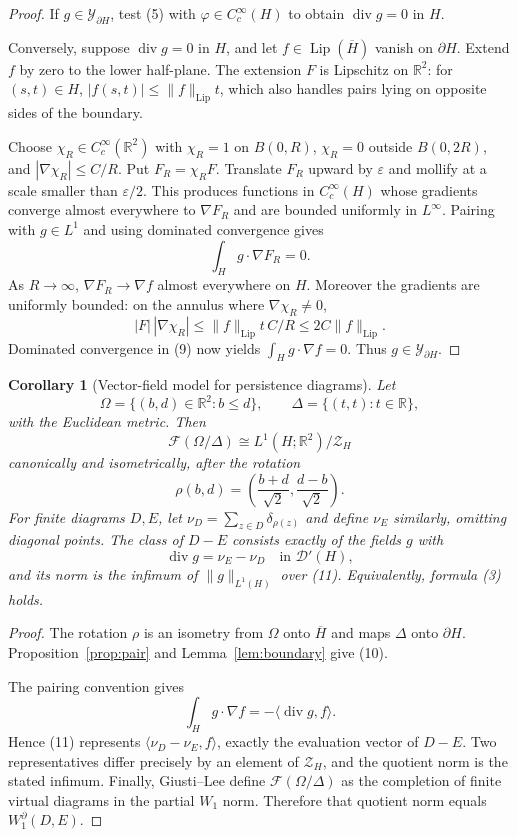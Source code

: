 \documentclass[11pt]{article}
\newtheorem{corollary}[theorem]{Corollary}
\newcommand{\F}{\mathcal F}
\newcommand{\Lip}{\operatorname{Lip}}
\newcommand{\R}{\mathbb R}
\newcommand{\D}{\mathcal D}
\newcommand{\diver}{\operatorname{div}}
\begin{document}
\begin{proof}
If $g\in\mathcal Y_{\partial H}$, test (5) with
$\varphi\in C_c^\infty(H)$ to obtain $\diver g=0$ in $H$.

Conversely, suppose $\diver g=0$ in $H$, and let
$f\in\Lip(\overline H)$ vanish on $\partial H$.  Extend $f$ by zero to the
lower half-plane.  The extension $F$ is Lipschitz on $\R^2$: for
$(s,t)\in H$, $|f(s,t)|\le \|f\|_{\Lip}t$, which also handles pairs lying on
opposite sides of the boundary.

Choose $\chi_R\in C_c^\infty(\R^2)$ with $\chi_R=1$ on $B(0,R)$,
$\chi_R=0$ outside $B(0,2R)$, and $|\nabla\chi_R|\le C/R$.  Put
$F_R=\chi_RF$.  Translate $F_R$ upward by $\varepsilon$ and mollify at a
scale smaller than $\varepsilon/2$.  This produces functions in
$C_c^\infty(H)$ whose gradients converge almost everywhere to $\nabla F_R$
and are bounded uniformly in $L^\infty$.  Pairing with $g\in L^1$ and using
dominated convergence gives
\[
 \int_H g\cdot\nabla F_R=0.                                   \tag{9}
\]
As $R\to\infty$, $\nabla F_R\to\nabla f$ almost everywhere on $H$.
Moreover the gradients are uniformly bounded: on the annulus where
$\nabla\chi_R\ne0$,
\[
 |F|\,|\nabla\chi_R|
 \le \|f\|_{\Lip}t\,C/R\le 2C\|f\|_{\Lip}.
\]
Dominated convergence in (9) now yields $\int_Hg\cdot\nabla f=0$.
Thus $g\in\mathcal Y_{\partial H}$.
\end{proof}

\begin{corollary}[Vector-field model for persistence diagrams]\label{cor:pd}
Let
\[
 \Omega=\{(b,d)\in\R^2:b\le d\},\qquad
 \Delta=\{(t,t):t\in\R\},
\]
with the Euclidean metric.  Then
\[
 \F(\Omega/\Delta)
 \cong L^1(H;\R^2)/\mathcal Z_H                              \tag{10}
\]
canonically and isometrically, after the rotation
\[
 \rho(b,d)=\left(\frac{b+d}{\sqrt2},\frac{d-b}{\sqrt2}\right).
\]
For finite diagrams $D,E$, let
$\nu_D=\sum_{z\in D}\delta_{\rho(z)}$ and define $\nu_E$ similarly, omitting
diagonal points.  The class of $D-E$ consists exactly of the fields $g$ with
\[
 \diver g=\nu_E-\nu_D\quad\text{in }\D'(H),                  \tag{11}
\]
and its norm is the infimum of $\|g\|_{L^1(H)}$ over (11).  Equivalently,
formula (3) holds.
\end{corollary}

\begin{proof}
The rotation $\rho$ is an isometry from $\Omega$ onto $\overline H$ and maps
$\Delta$ onto $\partial H$.  Proposition~\ref{prop:pair} and
Lemma~\ref{lem:boundary} give (10).

The pairing convention gives
\[
 \int_H g\cdot\nabla f
 =-\langle\diver g,f\rangle.
\]
Hence (11) represents
$\langle\nu_D-\nu_E,f\rangle$, exactly the evaluation vector of $D-E$.
Two representatives differ precisely by an element of $\mathcal Z_H$, and
the quotient norm is the stated infimum.  Finally, Giusti--Lee define
$\F(\Omega/\Delta)$ as the completion of finite virtual diagrams in the
partial $W_1$ norm.  Therefore that quotient norm equals
$W_1^\partial(D,E)$.
\end{proof}
\end{document}
